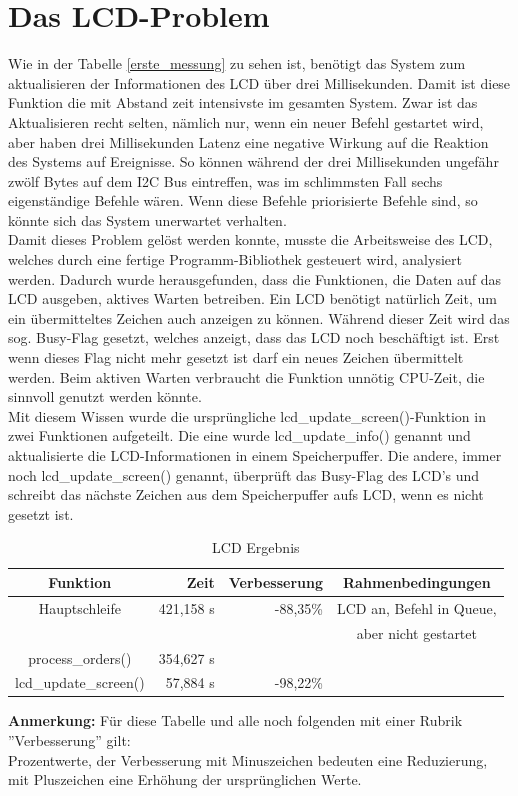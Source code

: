 \section{Das LCD-Problem\label{chapter_lcd_problem}}
Wie in der Tabelle \ref{erste_messung} zu sehen ist, benötigt das System zum aktualisieren der Informationen
des LCD über drei Millisekunden. Damit ist diese Funktion die mit Abstand zeit intensivste im gesamten System.
Zwar ist das Aktualisieren recht selten, nämlich nur, wenn ein neuer Befehl gestartet wird, aber haben drei
Millisekunden Latenz eine negative Wirkung auf die Reaktion des Systems auf Ereignisse. So können während
der drei Millisekunden ungefähr zwölf Bytes auf dem I2C Bus eintreffen, was im schlimmsten Fall sechs eigenständige
Befehle wären. Wenn diese Befehle priorisierte Befehle sind, so könnte sich das System unerwartet verhalten.\\
Damit dieses Problem gelöst werden konnte, musste die Arbeitsweise des LCD, welches durch eine fertige Programm-Bibliothek
gesteuert wird, analysiert werden. Dadurch wurde herausgefunden, dass die Funktionen, die Daten auf das LCD ausgeben,
aktives Warten betreiben. Ein LCD benötigt natürlich Zeit, um ein übermitteltes Zeichen auch anzeigen zu können.
Während dieser Zeit wird das sog. Busy-Flag gesetzt, welches anzeigt, dass das LCD noch beschäftigt ist. Erst
wenn dieses Flag nicht mehr gesetzt ist darf ein neues Zeichen übermittelt werden. Beim aktiven Warten verbraucht die
Funktion unnötig CPU-Zeit, die sinnvoll genutzt werden könnte.\\
Mit diesem Wissen wurde die ursprüngliche lcd\_\-update\_\-screen()-Funktion in zwei Funktionen aufgeteilt. Die eine
wurde lcd\_\-update\_\-info() genannt und aktualisierte die LCD-Informationen in einem Speicherpuffer. Die andere,
immer noch lcd\_\-update\_\-screen() genannt, überprüft das Busy-Flag des LCD's und schreibt das nächste Zeichen aus
dem Speicherpuffer aufs LCD, wenn es nicht gesetzt ist.
\begin{table}[htb]
\begin{center}
	\begin{tabular}{|c||r|r|c|}
		\hline
		\textbf{Funktion} & \textbf{Zeit} & \textbf{Verbesserung} & \textbf{Rahmenbedingungen} \\ \hline \hline
		Hauptschleife & 421,158 \textmu{}s & -88,35\% & LCD an, Befehl in Queue,\\
		& & & aber nicht gestartet \\ \hline
		process\_orders() & 354,627 \textmu{}s & & \\ \hline
		lcd\_update\_screen() & 57,884 \textmu{}s & -98,22\% & \\ \hline
	\end{tabular}
	\caption{\label{lcd_opt} LCD Ergebnis}
\end{center}
\textbf{Anmerkung:} Für diese Tabelle und alle noch folgenden mit einer Rubrik ''Verbesserung'' gilt:\\
Prozentwerte, der Verbesserung mit Minuszeichen bedeuten eine Reduzierung, mit Pluszeichen eine Erhöhung
der ursprünglichen Werte.
\end{table}
